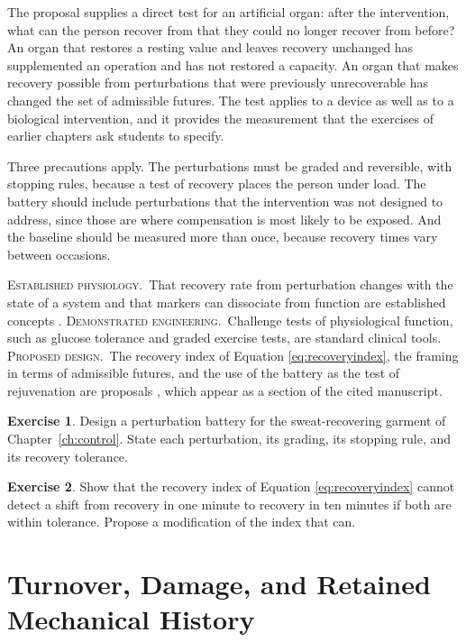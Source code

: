 \documentclass[11pt,openany]{book}
\theoremstyle{definition}
\newtheorem{exercise}{Exercise}[chapter]
\theoremstyle{remark}
\newcommand{\est}{\textsc{Established physiology.}\ }
\newcommand{\dem}{\textsc{Demonstrated engineering.}\ }
\newcommand{\pro}{\textsc{Proposed design.}\ }
\begin{document}
The proposal supplies a direct test for an artificial organ: after the intervention, what can the person recover from that they could no longer recover from before? An organ that restores a resting value and leaves recovery unchanged has supplemented an operation and has not restored a capacity. An organ that makes recovery possible from perturbations that were previously unrecoverable has changed the set of admissible futures. The test applies to a device as well as to a biological intervention, and it provides the measurement that the exercises of earlier chapters ask students to specify.

Three precautions apply. The perturbations must be graded and reversible, with stopping rules, because a test of recovery places the person under load. The battery should include perturbations that the intervention was not designed to address, since those are where compensation is most likely to be exposed. And the baseline should be measured more than once, because recovery times vary between occasions.

\begin{evidence}
\est That recovery rate from perturbation changes with the state of a system and that markers can dissociate from function are established concepts \cite{scheffer2009}. \dem Challenge tests of physiological function, such as glucose tolerance and graded exercise tests, are standard clinical tools. \pro The recovery index of Equation \eqref{eq:recoveryindex}, the framing in terms of admissible futures, and the use of the battery as the test of rejuvenation are proposals \cite{flyxion2026rejuv}, which appear as a section of the cited manuscript.
\end{evidence}

\begin{exercise}
Design a perturbation battery for the sweat-recovering garment of Chapter~\ref{ch:control}. State each perturbation, its grading, its stopping rule, and its recovery tolerance.
\end{exercise}

\begin{exercise}
Show that the recovery index of Equation \eqref{eq:recoveryindex} cannot detect a shift from recovery in one minute to recovery in ten minutes if both are within tolerance. Propose a modification of the index that can.
\end{exercise}

\chapter{Turnover, Damage, and Retained Mechanical History}
\label{ch:turnover}
\end{document}
